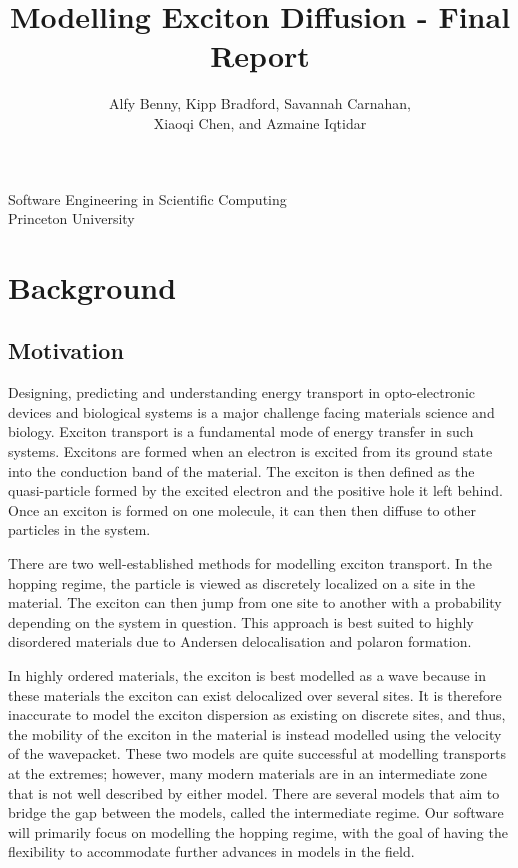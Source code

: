 \documentclass{article}
\title{Modelling Exciton Diffusion - Final Report}
\author{Alfy Benny, Kipp Bradford, Savannah Carnahan,\\ Xiaoqi Chen, and Azmaine Iqtidar}
\begin{document}
       \maketitle
      
       \vfill
            
       
            
      \vfill
     
       \begin{center}
            
       Software Engineering in Scientific Computing\\
       Princeton University\\
       
    \end{center}    
  
\newpage

\section{Background}

\subsection{Motivation}

Designing, predicting and understanding energy transport in opto-electronic devices and biological systems is a major challenge facing materials science and biology. Exciton transport is a fundamental mode of energy transfer in such systems. Excitons are formed when an electron is excited from its ground state into the conduction band of the material. The exciton is then defined as the quasi-particle formed by the excited electron and the positive hole it left behind. Once an exciton is formed on one molecule, it can then then diffuse to other particles in the system. 

There are two well-established methods for modelling exciton transport.\cite{Oberhofer2017ChargeMethods} In the hopping regime, the particle is viewed as discretely localized on a site in the material. The exciton can then jump from one site to another with a probability depending on the system in question. This approach is best suited to highly disordered materials due to Andersen delocalisation and polaron formation.\cite{DanielBalzer2021DelocalisedMaterials}

In highly ordered materials, the exciton is best modelled as a wave because in these materials the exciton can exist delocalized over several sites.\cite{Oberhofer2017ChargeMethods} It is therefore inaccurate to model the exciton dispersion as existing on discrete sites, and thus, the mobility of the exciton in the material is instead modelled using the velocity of the wavepacket. These two models are quite successful at modelling transports at the extremes; however, many modern materials are in an intermediate zone that is not well described by either model. There are several models that aim to bridge the gap between the models, called the intermediate regime. Our software will primarily focus on modelling the hopping regime, with the goal of having the flexibility to accommodate further advances in models in the field.
\end{document}
